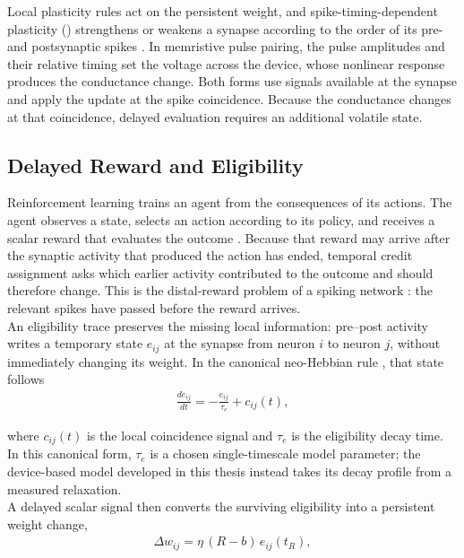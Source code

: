 \noindent Local plasticity rules act on the persistent weight, and spike-timing-dependent plasticity
() strengthens or weakens a synapse according to the order of its pre- and postsynaptic spikes
\cite{zheng2018learning, markram1997regulation}. In memristive pulse pairing, the pulse amplitudes and their relative
timing set the voltage across the device, whose nonlinear response produces the conductance change. Both forms use
signals available at the synapse and apply the update at the spike coincidence. Because the conductance changes at
that coincidence, delayed evaluation requires an additional volatile state.

\subsection[Delayed Reward and Eligibility]{Delayed Reward and Eligibility}\label{subsec:learning-paradigms}

\noindent Reinforcement learning trains an agent from the consequences of its actions. The agent observes a state,
selects an action according to its policy, and receives a scalar reward that evaluates the outcome
\cite{sutton2018reinforcement}. Because that reward may arrive after the synaptic activity that produced the action has
ended, temporal credit assignment asks which earlier activity contributed to the outcome and should therefore change.
This is the distal-reward problem of a spiking network \cite{izhikevich2007solving}: the relevant spikes have passed
before the reward arrives.\\

\noindent An eligibility trace preserves the missing local information: pre--post activity writes a temporary state
$e_{ij}$ at the synapse from neuron $i$ to neuron $j$, without immediately changing its weight. In the canonical
neo-Hebbian rule \cite{fremaux2016neuromodulated, gerstner2018eligibility}, that state follows
\begin{align}
    \frac{de_{ij}}{dt} = -\frac{e_{ij}}{\tau_e} + c_{ij}(t), \label{eq:2.3}
\end{align}

\noindent where $c_{ij}(t)$ is the local coincidence signal and $\tau_e$ is the eligibility decay time. In this
canonical form, $\tau_e$ is a chosen single-timescale model parameter; the device-based model developed in this
thesis instead takes its decay profile from a measured relaxation.\\

\noindent A delayed scalar signal then converts the surviving eligibility into a persistent weight change,
\begin{align}
    \Delta w_{ij} = \eta\,(R - b)\, e_{ij}(t_R), \label{eq:2.4}
\end{align}

